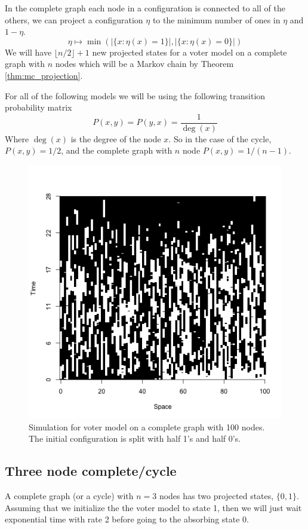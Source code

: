 In the complete graph each node in a configuration is connected to all of the others, we can project a configuration $\eta$ to the minimum number of ones in $\eta$ and $1 - \eta$.
$$
\eta \mapsto \min\left(|\{x : \eta(x) = 1\}|, |\{x : \eta(x) = 0\}|  \right)
$$
We will have $\lfloor n/2 \rfloor + 1$ new projected states for a voter model on a complete graph with $n$ nodes which will be a Markov chain
by Theorem \ref{thm:mc_projection}.

For all of the following models we will be using the following transition probability matrix
$$
P(x,y) = P(y,x) = \frac{1}{\deg(x)}
$$
Where $\deg(x)$ is the degree of the node $x$.
So in the case of the cycle, $P(x,y) = 1/2$, and the complete graph with $n$ node $P(x,y) = 1/(n - 1)$.

\begin{figure}[H]
  \centering
    \includegraphics[width=.80\textwidth]{figures/voter_simulation_1d_complete_split_100.png}
   \caption{Simulation for voter model on a complete graph with 100 nodes. The initial configuration is split with half 1's and half 0's.}
  \label{fig:voter_sim_1d_complete.png}
\end{figure}

\subsection{Three node complete/cycle}
A complete graph (or a cycle) with $n = 3$ nodes has two projected states, $\{0,1\}$.
Assuming that we initialize the the voter model to state 1, then we will just wait exponential time with rate 2 before going to the absorbing state 0.

